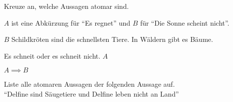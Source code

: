 \documentclass{uebungsblatt}
\begin{document}
\begin{exercise}

    Kreuze an, welche Aussagen atomar sind. 

    $A$ ist eine Abkürzung für \enquote{Es regnet} und $B$ für \enquote{Die Sonne scheint nicht}.

    \begin{multicols}{2}
        \begin{multiplechoice}
            \item $B$
            \citem Schildkröten sind die schnellsten Tiere.
            \citem In Wäldern gibt es Bäume.
            \item Es schneit oder es schneit nicht.
            \citem $A$
            \item $A \implies B$
        \end{multiplechoice}
    \end{multicols}

\end{exercise}

\begin{exercise}

    Liste alle atomaren Aussagen der folgenden Aussage auf.
    \\ 

    \enquote{Delfine sind Säugetiere und Delfine leben nicht an Land}

    \begin{answerbox}[0.5in]
    \end{answerbox}

\end{exercise}
\end{document}
